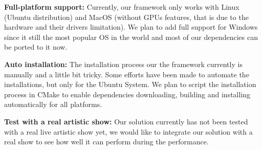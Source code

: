 \textbf{Full-platform support:} Currently, our framework only works with Linux
(Ubuntu distribution) and MacOS (without GPUs features, that is due to the
hardware and their drivers limitation). We plan to add full support for Windows
since it still the most popular OS in the world and most of our dependencies
can be ported to it now.

\textbf{Auto installation:} The installation process our the framework
currently is manually and a little bit tricky. Some efforts have been made to
automate the installations, but only for the Ubuntu System. We plan to script the installation process in
CMake to enable dependencies downloading, building and installing automatically
for all platforms.

\textbf{Test with a real artistic show:} Our solution currently has not been
tested with a real live artistic show yet, we would like to integrate 
our solution with a real show to see how well it can perform during the 
performance.



















































